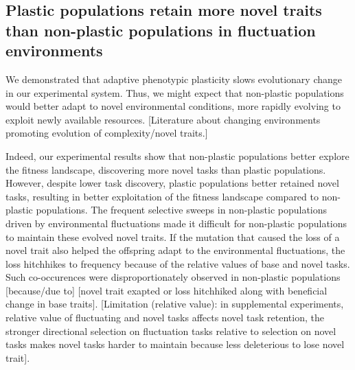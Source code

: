 \vspace{0.25cm}
\subsection{Plastic populations retain more novel traits than non-plastic populations in fluctuation environments}

We demonstrated that adaptive phenotypic plasticity slows evolutionary change in our experimental system. 
Thus, we might expect that non-plastic populations would better adapt to novel environmental conditions, more rapidly evolving to exploit newly available resources.
[Literature about changing environments promoting evolution of complexity/novel traits.]

Indeed, our experimental results show that non-plastic populations better explore the fitness landscape, discovering more novel tasks than plastic populations.
However, despite lower task discovery, plastic populations better retained novel tasks, resulting in better exploitation of the fitness landscape compared to non-plastic populations.
The frequent selective sweeps in non-plastic populations driven by environmental fluctuations made it difficult for non-plastic populations to maintain these evolved novel traits.
If the mutation that caused the loss of a novel trait also helped the offspring adapt to the environmental fluctuations, the loss hitchhikes to frequency because of the relative values of base and novel tasks.
Such co-occurences were disproportionately observed in non-plastic populations [because/due to] [novel trait exapted or loss hitchhiked along with beneficial change in base traits].
[Limitation (relative value): in supplemental experiments, relative value of fluctuating and novel tasks affects novel task retention, the stronger directional selection on fluctuation tasks relative to selection on novel tasks makes novel tasks harder to maintain because less deleterious to lose novel trait].

